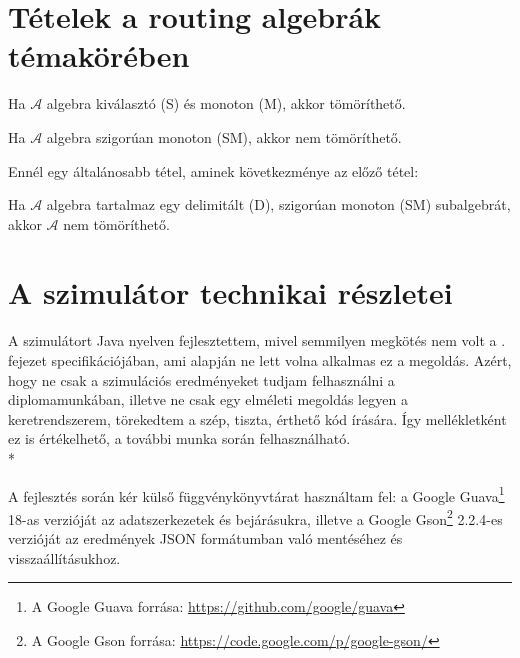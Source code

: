   \section{Tételek a routing algebrák témakörében}\label{algebratetelek}
  \begin{theorem} [Tömöríthetőség 1]\label{eq:algebratetel1}
    Ha $\mathcal{A}$ algebra kiválasztó (S) és monoton (M), akkor tömöríthető.
  \end{theorem}

  \begin{theorem} [Tömöríthetőség 2]\label{eq:algebratetel2}
    Ha $\mathcal{A}$ algebra szigorúan monoton (SM), akkor nem tömöríthető.
  \end{theorem}

  Ennél egy általánosabb tétel, aminek következménye az előző tétel:
  \begin{theorem} [Tömöríthetőség 3]\label{eq:algebratetel3}
    Ha $\mathcal{A}$ algebra tartalmaz egy delimitált (D), szigorúan monoton (SM) subalgebrát, akkor $\mathcal{A}$ nem tömöríthető.
  \end{theorem}
  \newpage

  \section{A szimulátor technikai részletei}\label{simulator}
  A szimulátort Java nyelven fejlesztettem, mivel semmilyen megkötés nem volt a . fejezet specifikációjában, ami alapján ne lett volna alkalmas ez a megoldás. Azért, hogy ne csak a szimulációs eredményeket tudjam felhasználni a diplomamunkában, illetve ne csak egy elméleti megoldás legyen a keretrendszerem, törekedtem a szép, tiszta, érthető kód írására. Így mellékletként ez is értékelhető, a további munka során felhasználható.\\*

  A fejlesztés során kér külső függvénykönyvtárat használtam fel: a Google Guava\footnote{A Google Guava forrása: \href{https://github.com/google/guava}{https://github.com/google/guava}} 18-as verzióját az adatszerkezetek és bejárásukra, illetve a Google Gson\footnote{A Google Gson forrása: \href{https://code.google.com/p/google-gson/}{https://code.google.com/p/google-gson/}} 2.2.4-es verzióját az eredmények JSON formátumban való mentéséhez és visszaállításukhoz.


